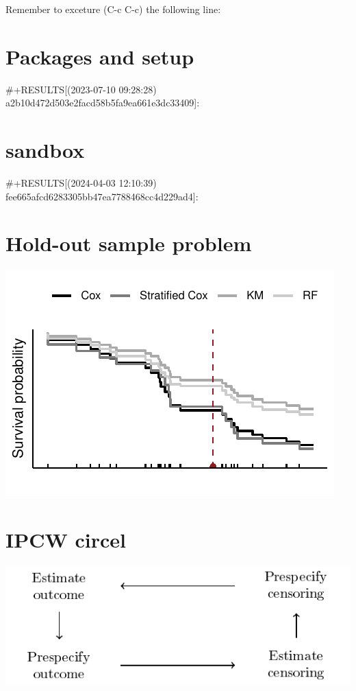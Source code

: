 \documentclass[11pt]{article}
\author{Anders Munch}
\date{\today}
\title{}
\begin{document}
\tableofcontents

Remember to exceture (C-c C-c) the following line:


\section{Packages and setup}
\label{sec:org3001f1d}
\#+RESULTS[(2023-07-10 09:28:28) a2b10d472d503e2facd58b5fa9ea661e3dc33409]:


\section{sandbox}
\label{sec:org1104cd8}
\#+RESULTS[(2024-04-03 12:10:39) fee665afcd6283305bb47ea7788468cc4d229ad4]:


\section{Hold-out sample problem}
\label{sec:org4240dec}
\begin{center}
\includegraphics[width=.9\linewidth]{sl-hold-out-sample.pdf}
\end{center}



\section{IPCW circel}
\label{sec:orgafe3f90}

\begin{center}
\includegraphics[width=.9\linewidth]{ipcw-circle.pdf}
\end{center}
\end{document}

